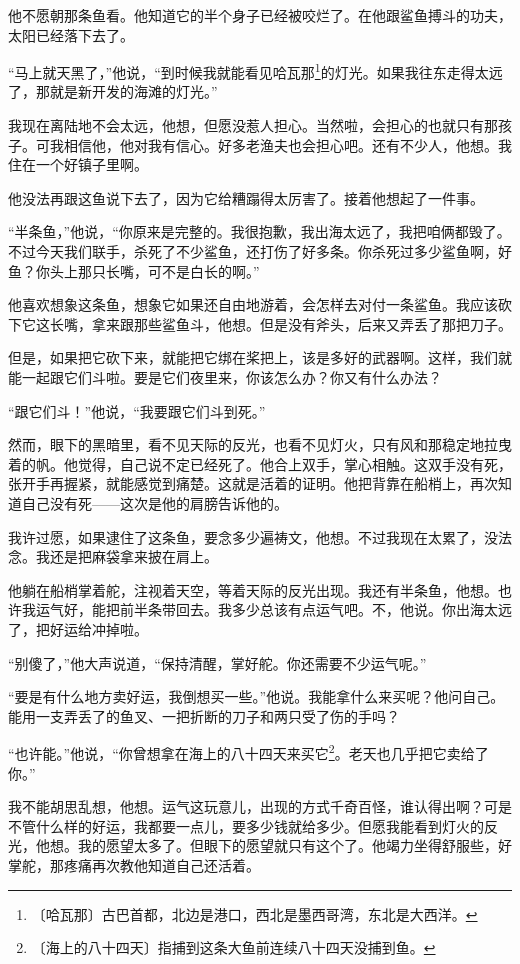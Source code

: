 \documentclass[12pt,UTF-8,openany]{ctexbook}
\begin{document}
\begin{normalsize}
    他不愿朝那条鱼看。他知道它的半个身子已经被咬烂了。在他跟鲨鱼搏斗的功夫，太阳已经落下去了。
    
    “马上就天黑了，”他说，“到时候我就能看见哈瓦那\footnote{〔哈瓦那〕古巴首都，北边是港口，西北是墨西哥湾，东北是大西洋。}的灯光。如果我往东走得太远了，那就是新开发的海滩的灯光。”
    
    我现在离陆地不会太远，他想，但愿没惹人担心。当然啦，会担心的也就只有那孩子。可我相信他，他对我有信心。好多老渔夫也会担心吧。还有不少人，他想。我住在一个好镇子里啊。
    
    他没法再跟这鱼说下去了，因为它给糟蹋得太厉害了。接着他想起了一件事。
    
    “半条鱼，”他说，“你原来是完整的。我很抱歉，我出海太远了，我把咱俩都毁了。不过今天我们联手，杀死了不少鲨鱼，还打伤了好多条。你杀死过多少鲨鱼啊，好鱼？你头上那只长嘴，可不是白长的啊。”
    
    他喜欢想象这条鱼，想象它如果还自由地游着，会怎样去对付一条鲨鱼。我应该砍下它这长嘴，拿来跟那些鲨鱼斗，他想。但是没有斧头，后来又弄丢了那把刀子。
    
    但是，如果把它砍下来，就能把它绑在桨把上，该是多好的武器啊。这样，我们就能一起跟它们斗啦。要是它们夜里来，你该怎么办？你又有什么办法？
    
    “跟它们斗！”他说，“我要跟它们斗到死。”
    
    然而，眼下的黑暗里，看不见天际的反光，也看不见灯火，只有风和那稳定地拉曳着的帆。他觉得，自己说不定已经死了。他合上双手，掌心相触。这双手没有死，张开手再握紧，就能感觉到痛楚。这就是活着的证明。他把背靠在船梢上，再次知道自己没有死——这次是他的肩膀告诉他的。
    
    我许过愿，如果逮住了这条鱼，要念多少遍祷文，他想。不过我现在太累了，没法念。我还是把麻袋拿来披在肩上。
    
    他躺在船梢掌着舵，注视着天空，等着天际的反光出现。我还有半条鱼，他想。也许我运气好，能把前半条带回去。我多少总该有点运气吧。不，他说。你出海太远了，把好运给冲掉啦。
    
    “别傻了，”他大声说道，“保持清醒，掌好舵。你还需要不少运气呢。”
    
    “要是有什么地方卖好运，我倒想买一些。”他说。我能拿什么来买呢？他问自己。能用一支弄丢了的鱼叉、一把折断的刀子和两只受了伤的手吗？
    
    “也许能。”他说，“你曾想拿在海上的八十四天来买它\footnote{〔海上的八十四天〕指捕到这条大鱼前连续八十四天没捕到鱼。}。老天也几乎把它卖给了你。”
    
    我不能胡思乱想，他想。运气这玩意儿，出现的方式千奇百怪，谁认得出啊？可是不管什么样的好运，我都要一点儿，要多少钱就给多少。但愿我能看到灯火的反光，他想。我的愿望太多了。但眼下的愿望就只有这个了。他竭力坐得舒服些，好掌舵，那疼痛再次教他知道自己还活着。
    

\end{normalsize}
\end{document}
